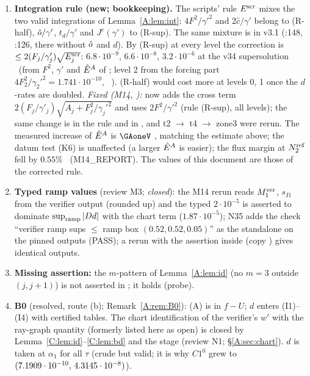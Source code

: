 \documentclass[11pt]{article}
\begin{document}
\begin{enumerate}[label=(G-A\arabic*),leftmargin=3.4em]
\item \textbf{Integration rule (new; bookkeeping).} The scripts' rule $E^{\rm scr}$ mixes the two valid integrations of Lemma~\ref{A:lem:int}: $4F^2/\gamma'^2$ and $2\hat c/\gamma'$ belong to (R-half), $\hat o/\gamma'$, $t_d/\gamma'$ and $J^e(\gamma')$ to (R-sup). The same mixture is in v3.1 (:148, :126, there without $\hat o$ and $d$). By (R-sup) at every level the correction is $\le2(F_j/\gamma'_j)\sqrt{E^{\rm scr}_j}$: $6.8\cdot10^{-9}$, $6.6\cdot10^{-8}$, $3.2\cdot10^{-6}$ at the v34 supersolution \tE\ (from $F^2$, $\gamma'$ and $\hat E^A$ of ; level 2 from the forcing part $4F_2^2/\gamma_2'^2=1.741\cdot10^{-10}$, \SA\ ). (R-half) would cost more at levels 0, 1 once the $d$-rates are doubled. \emph{Fixed (M14, ):}  now adds the cross term $2(F_j/\gamma'_j)\sqrt{A_j+F_j^2/\gamma_j'^2}$ and uses $2F^2/\gamma'^2$ (rule (R-sup), all levels); the same change is in the rule  and in , and t2 $\to$ t4 $\to$ zone3 were rerun. The measured increase of $\hat E^A$ is $\GAoneV$ \tE, matching the estimate above; the datum test (K6) is unaffected (a larger $\hat E^A$ is easier); the flux margin at $N_2^{\rm ref}$ fell by $0.55\%$ \tE\ (M14\_REPORT). The values of this document are those of the corrected rule.
\item \textbf{Typed ramp values} (review M3; \emph{closed}): the M14 rerun reads $M_1^{\rm ver}$, $s_{I1}$ from the verifier output (rounded up) and the typed $2\cdot10^{-5}$ is asserted to dominate $\sup_{\rm ramp}|Dd|$ with the chart term ($1.87\cdot10^{-5}$); N35 adds the check ``verifier ramp sups $\le$ ramp box $(0.52,0.52,0.05)$'' as the standalone  on the pinned outputs (PASS); a rerun with the assertion inside  (copy ) gives identical outputs.
\item \textbf{Missing assertion:} the $m$-pattern of Lemma~\ref{A:lem:id} (no $m=3$ outside $(j,j+1)$) is not asserted in ; it holds (probe).
\item \textbf{B0} (resolved, route (b); Remark~\ref{A:rem:B0}): (A) is in $f-U$; $d$ enters (I1)--(I4) with certified tables. The chart identification of the verifier's $w'$ with the ray-graph quantity (formerly listed here as open) is closed by Lemma~\ref{C:lem:id}--\ref{C:lem:bd} and the stage  (review N1; \S\ref{A:sec:chart}). $d$ is taken at $\alpha_1$ for all $\tau$ (crude but valid; it is why $C1^0$ grew to $(7.1909\cdot10^{-10},\,4.3145\cdot10^{-8})$).

\end{enumerate}
\end{document}
